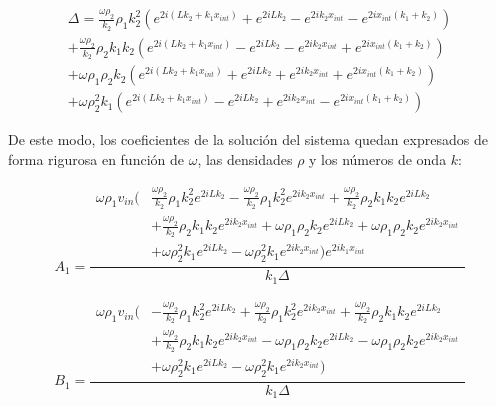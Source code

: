 \documentclass[11pt,letterpaper]{article}
\begin{document}
\begin{multline}
    \Delta = \frac{\omega \rho_{2}}{k_{2}} \rho_{1} k_{2}^{2} \left( e^{2 i \left(L k_{2} + k_{1} x_{int}\right)} + e^{2 i L k_{2}} - e^{2 i k_{2} x_{int}} - e^{2 i x_{int} \left(k_{1} + k_{2}\right)} \right) \\
    + \frac{\omega \rho_{2}}{k_{2}} \rho_{2} k_{1} k_{2} \left( e^{2 i \left(L k_{2} + k_{1} x_{int}\right)} - e^{2 i L k_{2}} - e^{2 i k_{2} x_{int}} + e^{2 i x_{int} \left(k_{1} + k_{2}\right)} \right) \\
    + \omega \rho_{1} \rho_{2} k_{2} \left( e^{2 i \left(L k_{2} + k_{1} x_{int}\right)} + e^{2 i L k_{2}} + e^{2 i k_{2} x_{int}} + e^{2 i x_{int} \left(k_{1} + k_{2}\right)} \right) \\
    + \omega \rho_{2}^{2} k_{1} \left( e^{2 i \left(L k_{2} + k_{1} x_{int}\right)} - e^{2 i L k_{2}} + e^{2 i k_{2} x_{int}} - e^{2 i x_{int} \left(k_{1} + k_{2}\right)} \right)
\end{multline}

De este modo, los coeficientes de la solución del sistema quedan expresados de forma rigurosa en función de $\omega$, las densidades $\rho$ y los números de onda $k$:

\begin{equation}
    A_1 = \frac{
        \begin{aligned}
            \omega \rho_{1} v_{in} \big( & \frac{\omega \rho_{2}}{k_{2}} \rho_{1} k_{2}^{2} e^{2 i L k_{2}} - \frac{\omega \rho_{2}}{k_{2}} \rho_{1} k_{2}^{2} e^{2 i k_{2} x_{int}} + \frac{\omega \rho_{2}}{k_{2}} \rho_{2} k_{1} k_{2} e^{2 i L k_{2}} \\
            & + \frac{\omega \rho_{2}}{k_{2}} \rho_{2} k_{1} k_{2} e^{2 i k_{2} x_{int}} + \omega \rho_{1} \rho_{2} k_{2} e^{2 i L k_{2}} + \omega \rho_{1} \rho_{2} k_{2} e^{2 i k_{2} x_{int}} \\
            & + \omega \rho_{2}^{2} k_{1} e^{2 i L k_{2}} - \omega \rho_{2}^{2} k_{1} e^{2 i k_{2} x_{int}} \big) e^{2 i k_{1} x_{int}}
        \end{aligned}
    }{
        k_{1} \Delta
    }
\end{equation}

\begin{equation}
    B_1 = \frac{
        \begin{aligned}
            \omega \rho_{1} v_{in} \big( & -\frac{\omega \rho_{2}}{k_{2}} \rho_{1} k_{2}^{2} e^{2 i L k_{2}} + \frac{\omega \rho_{2}}{k_{2}} \rho_{1} k_{2}^{2} e^{2 i k_{2} x_{int}} + \frac{\omega \rho_{2}}{k_{2}} \rho_{2} k_{1} k_{2} e^{2 i L k_{2}} \\
            & + \frac{\omega \rho_{2}}{k_{2}} \rho_{2} k_{1} k_{2} e^{2 i k_{2} x_{int}} - \omega \rho_{1} \rho_{2} k_{2} e^{2 i L k_{2}} - \omega \rho_{1} \rho_{2} k_{2} e^{2 i k_{2} x_{int}} \\
            & + \omega \rho_{2}^{2} k_{1} e^{2 i L k_{2}} - \omega \rho_{2}^{2} k_{1} e^{2 i k_{2} x_{int}} \big)
        \end{aligned}
    }{
        k_{1} \Delta
    }
\end{equation}
\end{document}
